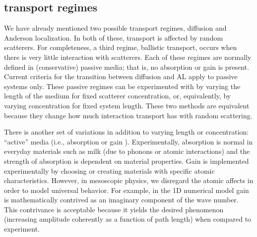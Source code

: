 \subsection{transport regimes}
We have already mentioned two possible transport regimes, diffusion   and Anderson localization. In both of these, transport is affected by random scatterers. For completeness, a third regime, ballistic transport, occurs when there is very little interaction with scatterers. Each of these regimes are normally defined in (conservative) passive media; that is, no absorption or gain is present. Current criteria for the transition between diffusion and AL apply to passive systems only. These passive regimes can be experimented with by varying the length of the medium for fixed scatterer concentration, or, equivalently, by varying concentration for fixed system length. These two methods are equivalent because they change how much interaction transport has with random scattering. 


There is another set of variations in addition to varying length or concentration: ``active'' media (i.e., absorption or gain ). Experimentally, absorption is normal in everyday materials such as milk (due to phonons or atomic interactions) and the strength of absorption is dependent on material properties. Gain is implemented experimentally by choosing or creating materials with specific atomic characteristics. However, in mesoscopic physics, we disregard the atomic affects in order to model universal behavior. For example, in the 1D numerical model gain is mathematically contrived as an imaginary component of the wave number. This contrivance is acceptable because it yields the desired phenomenon (increasing amplitude coherently as a function of path length) when compared to experiment.

